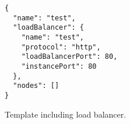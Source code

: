 \begin{figure}[tb]
  \begin{center}
    \begin{verbatim}
{
  "name": "test",
  "loadBalancer": {
    "name": "test",
    "protocol": "http",
    "loadBalancerPort": 80,
    "instancePort": 80
  }, 
  "nodes": []
}
    \end{verbatim}
  \end{center}
  \caption{Template including load balancer.}
  \label{list:validation-loadbalancer}
\end{figure}

